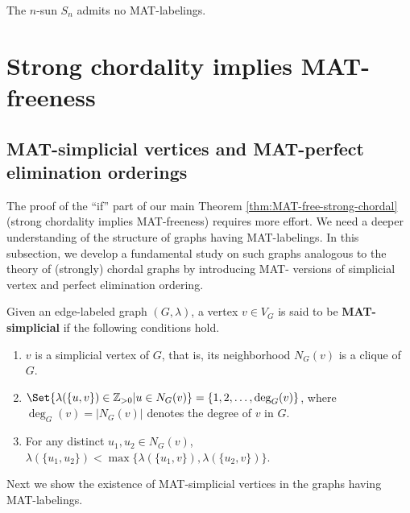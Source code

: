 \begin{corollary}
The $ n $-sun $ S_{n} $ admits no MAT-labelings. 
\end{corollary}

\section{Strong chordality implies MAT-freeness}
\subsection{MAT-simplicial vertices and MAT-perfect elimination orderings}
\label{subsec:MAT-S-PEO}
 
The proof of the ``if'' part of our main Theorem \ref{thm:MAT-free-strong-chordal} (strong chordality implies MAT-freeness) requires more effort. 
We need a deeper understanding of the structure of graphs having MAT-labelings. 
In this subsection, we develop a fundamental study on such graphs analogous to the theory of (strongly) chordal graphs by introducing MAT- versions of simplicial vertex and perfect elimination ordering.
\begin{definition}
\label{definition MAT-simplicial}
Given an edge-labeled graph $ (G,\lambda) $, a vertex $ v \in V_{G} $ is said to be \textbf{MAT-simplicial} if the following conditions hold. 
\begin{enumerate}[(MS1)]
\item\label{definition MAT-simplicial 1} $ v $ is a simplicial vertex of $ G $, that is, its neighborhood $ N_{G}(v) $ is a clique of $ G $.
\item\label{definition MAT-simplicial 2} $ \Set{\lambda(\{u,v\}) \in \mathbb{Z}_{>0} | u \in N_{G}(v) } = \{1,2, \dots, \deg_{G}(v)\} $, where $ \deg_{G}(v) =|N_{G}(v) |$ denotes the degree  of $ v $ in $ G $. 
\item\label{definition MAT-simplicial 3} For any distinct  $ u_{1}, u_{2} \in N_{G}(v) $, $ \lambda(\{u_{1}, u_{2}\}) < \max\{\lambda(\{u_{1}, v\}), \lambda(\{u_{2}, v\})\} $. 
\end{enumerate}
\end{definition}


Next we show the existence of MAT-simplicial vertices in the graphs having MAT-labelings.


